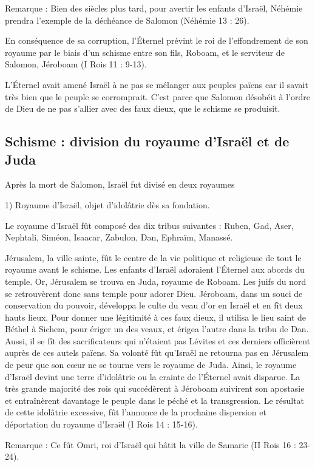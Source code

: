Remarque : Bien des siècles plus tard, pour avertir les enfants d'Israël, Néhémie prendra l'exemple de la déchéance de Salomon (Néhémie 13 : 26).

En conséquence de sa corruption, l’Éternel prévint le roi de l'effondrement de son royaume par le biais d'un schisme entre son fils, Roboam, et le serviteur de Salomon, Jéroboam (I Rois 11 : 9-13).

L’Éternel avait amené Israël à ne pas se mélanger aux peuples païens car il savait très bien que le peuple se corromprait. C'est parce que Salomon désobéit à l'ordre de Dieu de ne pas s'allier avec des faux dieux, que le schisme se produisit.

\subsection*{Schisme : division du royaume d'Israël et de Juda}

Après la mort de Salomon, Israël fut divisé en deux royaumes

1) Royaume d'Israël, objet d'idolâtrie dès sa fondation.

Le royaume d'Israël fût composé des dix tribus suivantes : Ruben, Gad, Aser, Nephtali, Siméon, Isaacar, Zabulon, Dan, Ephraïm, Manassé.
 
Jérusalem, la ville sainte, fût le centre de la vie politique et religieuse de tout le royaume avant le schisme. Les enfants d'Israël adoraient l’Éternel aux abords du temple. Or, Jérusalem se trouva en Juda, royaume de Roboam.
Les juifs du nord se retrouvèrent donc sans temple pour adorer Dieu. Jéroboam, dans un souci de conservation du pouvoir, développa le culte du veau d'or en Israël et en fît deux hauts lieux.
Pour donner une légitimité à ces faux dieux, il utilisa le lieu saint de Béthel à Sichem, pour ériger un des veaux, et érigea l'autre dans la tribu de Dan. Aussi, il se fît des sacrificateurs qui n'étaient pas Lévites et ces derniers officièrent auprès de ces autels païens. Sa volonté fût qu'Israël ne retourna pas en Jérusalem de peur que son cœur ne se tourne vers le royaume de Juda. Ainsi, le royaume d'Israël devint une terre d'idolâtrie ou la crainte de l’Éternel avait disparue. La très grande majorité des rois qui succédèrent à Jéroboam suivirent son apostasie et entraînèrent davantage le peuple dans le péché et la transgression.
Le résultat de cette idolâtrie excessive, fût l'annonce de la prochaine dispersion et déportation du royaume d'Israël (I Rois 14 : 15-16).

Remarque : Ce fût Omri, roi d'Israël qui bâtit la ville de Samarie (II Rois 16 : 23-24).

